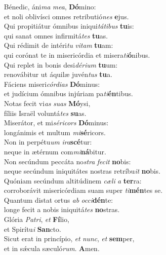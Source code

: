 \evenverse Bénedic, áni\textit{ma} \textit{me}\textit{a}, \textbf{Dó}mino:~\*\\
\evenverse et noli oblivísci omnes retributió\textit{nes} \textbf{e}jus.\\
\oddverse Qui propitiátur ómnibus iniqui\textit{tá}\textit{ti}\textit{bus} \textbf{tu}is:~\*\\
\oddverse qui sanat omnes infirmitá\textit{tes} \textbf{tu}as.\\
\evenverse Qui rédimit de intéri\textit{tu} \textit{vi}\textit{tam} \textbf{tu}am:~\*\\
\evenverse qui corónat te in misericórdia et misera\textit{ti}\textbf{ó}nibus.\\
\oddverse Qui replet in bonis desi\textit{dé}\textit{ri}\textit{um} \textbf{tu}um:~\*\\
\oddverse renovábitur ut áquilæ juvén\textit{tus} \textbf{tu}a.\\
\evenverse Fáciens miseri\textit{cór}\textit{di}\textit{as} \textbf{Dó}minus:~\*\\
\evenverse et judícium ómnibus injúriam pa\textit{ti}\textbf{én}tibus.\\
\oddverse Notas fecit vi\textit{as} \textit{su}\textit{as} \textbf{Mó}ysi,~\*\\
\oddverse fíliis Israël voluntá\textit{tes} \textbf{su}as.\\
\evenverse Miserátor, et mi\textit{sé}\textit{ri}\textit{cors} \textbf{Dó}minus:~\*\\
\evenverse longánimis et multum \textit{mi}\textbf{sé}ricors.\\
\oddverse Non in perpétu\textit{um} \textit{i}\textit{ra}\textbf{scé}tur:~\*\\
\oddverse neque in ætérnum com\textit{mi}\textbf{ná}bitur.\\
\evenverse Non secúndum peccáta no\textit{stra} \textit{fe}\textit{cit} \textbf{no}bis:~\*\\
\evenverse neque secúndum iniquitátes nostras retríbu\textit{it} \textbf{no}bis.\\
\oddverse Quóniam secúndum altitúdinem \textit{cæ}\textit{li} \textit{a} \textbf{ter}ra:~\*\\
\oddverse corroborávit misericórdiam suam super \textit{ti}\textbf{mén}tes se.\\
\evenverse Quantum distat ortus \textit{ab} \textit{oc}\textit{ci}\textbf{dén}te:~\*\\
\evenverse longe fecit a nobis iniquitá\textit{tes} \textbf{no}stras.\\
\oddverse Glória \textit{Pa}\textit{tri}, \textit{et} \textbf{Fí}lio,~\*\\
\oddverse et Spirítu\textit{i} \textbf{San}cto.\\
\evenverse Sicut erat in princípio, \textit{et} \textit{nunc}, \textit{et} \textbf{sem}per,~\*\\
\evenverse et in sǽcula sæculó\textit{rum}. \textbf{A}men.\\
